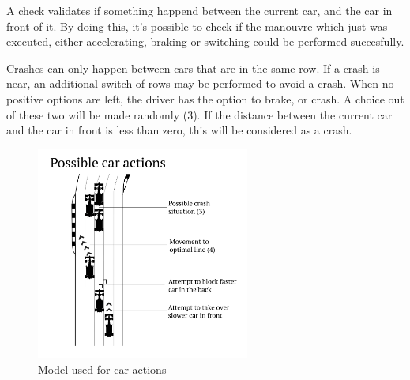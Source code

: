 A check validates if something happend between the current car, and the car in front of it. By doing this, it's possible to check if the manouvre which just was executed, either accelerating, braking or switching could be performed succesfully.

Crashes can only happen between cars that are in the same row. If a crash is near, an additional switch of rows may be performed to avoid a crash. When no positive options are left, the driver has the option to brake, or crash. A choice out of these two will be made randomly (3). If the distance between the current car and the car in front is less than zero, this will be considered as a crash.

\begin{figure}[H]
\includegraphics[width=7cm]{f1start-02}
\caption{Model used for car actions}
\end{figure}
